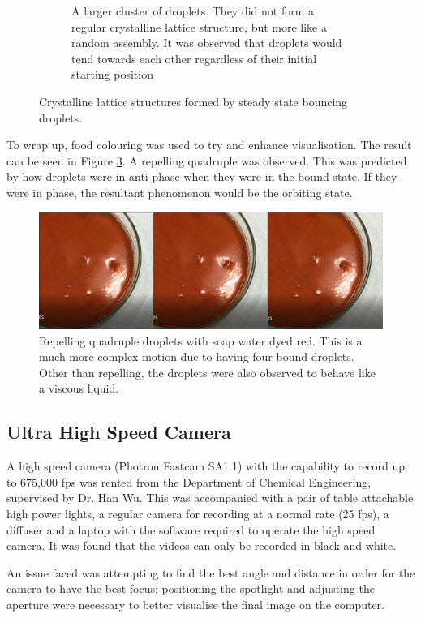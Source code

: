 \begin{figure}[ht]
\begin{subfigure}[t]{0.5\textwidth}
        \caption{A larger cluster of droplets. They did not form a regular crystalline lattice structure, but more like a random assembly. It was observed that droplets would tend towards each other regardless of their initial starting position}
        \label{fig:irregular_structure}
    \end{subfigure}
\caption{Crystalline lattice structures formed by steady state bouncing droplets.}
\label{fig:irregular_structure_evolution}
\end{figure}


To wrap up, food colouring was used to try and enhance visualisation. The result can be seen in Figure \ref{fig:red_dye}. A repelling quadruple was observed. This was predicted by how droplets were in anti-phase when they were in the bound state. If they were in phase, the resultant phenomenon would be the orbiting state.

\begin{figure}[ht]
\includegraphics[width=\textwidth]{prototype/exp_rep_imgs/red_dye.jpg}
\centering
\caption{Repelling quadruple droplets with soap water dyed red. This is a much more complex motion due to having four bound droplets. Other than repelling, the droplets were also observed to behave like a viscous liquid.}
\centering
\label{fig:red_dye}
\end{figure}

\subsection{Ultra High Speed Camera}
A high speed camera (Photron Fastcam SA1.1) with the capability to record up to 675,000 fps was rented from the Department of Chemical Engineering, supervised by Dr. Han Wu. This was accompanied with a pair of table attachable high power  lights, a regular camera for recording at a normal rate (25 fps), a diffuser and a laptop with the software required to operate the high speed camera. It was found that the videos can only be recorded in black and white.

An issue faced was attempting to find the best angle and distance in order for the camera to have the best focus; positioning the spotlight and adjusting the aperture were necessary to better visualise the final image on the computer.

